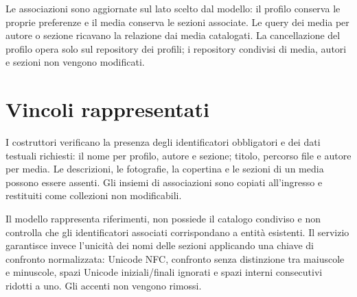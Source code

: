 Le associazioni sono aggiornate sul lato scelto dal modello: il profilo conserva le proprie preferenze e il media conserva le sezioni associate. Le query dei media per autore o sezione ricavano la relazione dai media catalogati. La cancellazione del profilo opera solo sul repository dei profili; i repository condivisi di media, autori e sezioni non vengono modificati.

\section{Vincoli rappresentati}
I costruttori verificano la presenza degli identificatori obbligatori e dei dati testuali richiesti: il nome per profilo, autore e sezione; titolo, percorso file e autore per media. Le descrizioni, le fotografie, la copertina e le sezioni di un media possono essere assenti. Gli insiemi di associazioni sono copiati all'ingresso e restituiti come collezioni non modificabili.

Il modello rappresenta riferimenti, non possiede il catalogo condiviso e non controlla che gli identificatori associati corrispondano a entità esistenti. Il servizio garantisce invece l'unicità dei nomi delle sezioni applicando una chiave di confronto normalizzata: Unicode NFC, confronto senza distinzione tra maiuscole e minuscole, spazi Unicode iniziali/finali ignorati e spazi interni consecutivi ridotti a uno. Gli accenti non vengono rimossi.
